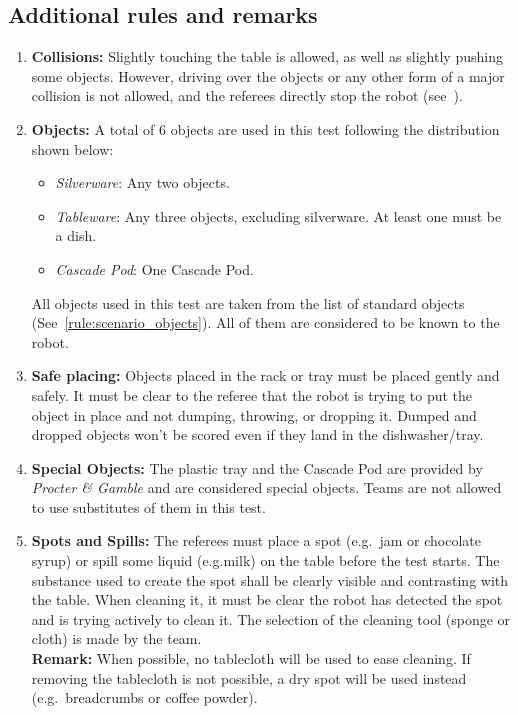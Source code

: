 \subsection{Additional rules and remarks}
\begin{enumerate}
	\item \textbf{Collisions:} Slightly touching the table is allowed, as well as slightly pushing some objects. However, driving over the objects or any other form of a major collision is not allowed, and the referees directly stop the robot (see~).

	\item \textbf{Objects:} A total of 6 objects are used in this test following the distribution shown below:
	\begin{itemize}
		\item\textit{Silverware}: Any two objects.
		\item\textit{Tableware}: Any three objects, excluding silverware. At least one must be a dish.
		\item\textit{Cascade Pod}: One Cascade Pod.
	\end{itemize}
	All objects used in this test are taken from the list of standard objects (See~\ref{rule:scenario_objects}). All of them are considered to be known to the robot.

	\item \textbf{Safe placing:} Objects placed in the rack or tray must be placed gently and safely. It must be clear to the referee that the robot is trying to put the object in place and not dumping, throwing, or dropping it. Dumped and dropped objects won't be scored even if they land in the dishwasher/tray.

	\item \textbf{Special Objects:} The plastic tray and the Cascade Pod are provided by \textit{Procter \& Gamble} and are considered special objects. Teams are not allowed to use substitutes of them in this test.

	\item \textbf{Spots and Spills:} The referees must place a spot (e.g.~jam or chocolate syrup) or spill some liquid (e.g.milk) on the table before the test starts. The substance used to create the spot shall be clearly visible and contrasting with the table. When cleaning it, it must be clear the robot has detected the spot and is trying actively to clean it. The selection of the cleaning tool (sponge or cloth) is made by the team.\\
	\textbf{Remark:} When possible, no tablecloth will be used to ease cleaning. If removing the tablecloth is not possible, a dry spot will be used instead (e.g.~breadcrumbs or coffee powder).


\end{enumerate}
